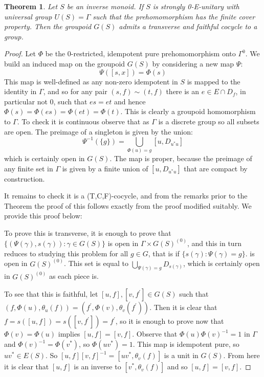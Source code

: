 \documentclass[11pt]{amsart}
\theoremstyle{plain}
\newtheorem{theorem}{Theorem}%
\theoremstyle{definition}%
\theoremstyle{remark}%
\begin{document}
\begin{theorem}\label{Thm:IT2-a}
Let $S$ be an inverse monoid. If $S$ is strongly 0-E-unitary with universal group $U(S)=\Gamma$ such that the prehomomorphism has the finite cover property. Then the groupoid $G(S)$ admits a transverse and faithful cocycle to a group.
\end{theorem}
\begin{proof}
Let $\Phi$ be the 0-restricted, idempotent pure prehomomorphism onto $\Gamma^{0}$. We build an induced map on the groupoid $G(S)$ by considering a new map $\Psi:$
\begin{equation*}
\Psi([s,x])=\Phi(s)
\end{equation*}
This map is well-defined as any non-zero idempotent in $S$ is mapped to the identity in $\Gamma$, and so for any pair $(s,f) \sim (t,f)$ there is an $e \in E \cap D_{f}$, in particular not $0$, such that $es=et$ and hence $\Phi(s)=\Phi(es)=\Phi(et)=\Phi(t)$. This is clearly a groupoid homomorphism to $\Gamma$. To check it is continuous observe that as $\Gamma$ is a discrete group so all subsets are open. The preimage of a singleton is given by the union:
\begin{equation*}
\Psi^{-1}(\lbrace g \rbrace)=\bigcup_{\Phi(u)=g}[u,D_{u^{*}u}] 
\end{equation*}
which is certainly open in $G(S)$. The map is proper, because the preimage of any finite set in $\Gamma$ is given by a finite union of $[u,D_{u^{*}u}]$ that are compact by construction.

It remains to check it is a (T,C,F)-cocycle, and from the remarks prior to the Theorem the proof of this follows exactly from the proof \cite[Proposition 3.6]{MR1900993} modified suitably. We provide this proof below:

To prove this is transverse, it is enough to prove that $\lbrace (\Psi(\gamma),s(\gamma)):\gamma \in G(S)\rbrace$ is open in $\Gamma \times G(S)^{(0)}$, and this in turn reduces to studying this problem for all $g \in G$, that is if $\lbrace s(\gamma) :\Psi(\gamma)=g \rbrace$. is open in $G(S)^{(0)}$. This set is equal to $\bigcup_{\Psi(\gamma)=g}D_{s(\gamma)}$, which is certainly open in $G(S)^{(0)}$ as each piece is.

To see that this is faithful, let $[u,f], [v,f^{'}] \in G(S)$ such that $(f,\Phi(u),\theta_{u}(f))=(f^{'},\Phi(v),\theta_{v}(f^{'}))$. Then it is clear that $f=s([u,f])=s([v,f^{'}])=f^{'}$, so it is enough to prove now that $\Phi(v)=\Phi(u)$ implies $[u,f]=[v,f]$. Observe that $\Phi(u)\Phi(v)^{-1}=1$ in $\Gamma$ and $\Phi(v)^{-1}=\Phi(v^{*})$, so $\Phi(uv^{*})=1$. This map is idempotent pure, so $uv^{*} \in E(S)$. So $[u,f][v,f]^{-1}=[uv^{*},\theta_{v}(f)]$ is a unit in $G(S)$. From here it is clear that $[u,f]$ is an inverse to $[v^{*},\theta_{v}(f)]$ and so $[u,f]=[v,f]$.\end{proof}
\end{document}
